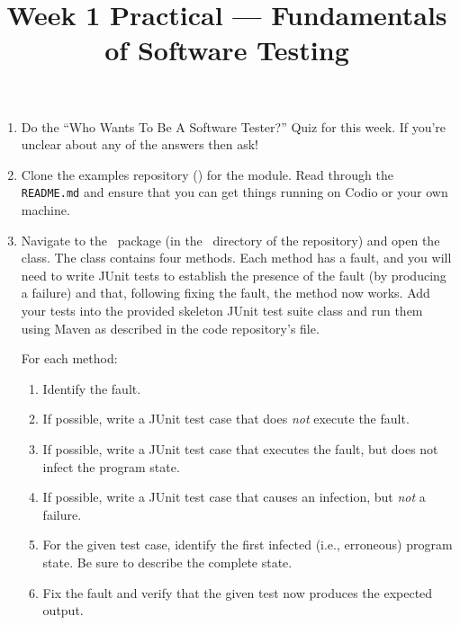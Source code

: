 



\title{Week 1 Practical --- Fundamentals of Software Testing}

\begin{enumerate}

    \item Do the ``Who Wants To Be A Software Tester?'' Quiz for this week. If
    you're unclear about any of the answers then ask!

    \item Clone the examples repository (\coderepourl) for the module. Read
    through the {\tt README.md} and ensure that you can get things running on
    Codio or your own machine.

    \item Navigate to the \practicalspackage~package (in the
    \practicalsdirectory~directory of the repository) and open the \weekoneclass
    class. The class contains four methods. Each method has a fault, and you
    will need to write JUnit tests to establish the presence of the fault (by
    producing a failure) and that, following fixing the fault, the method now
    works. Add your tests into the provided skeleton \testweekoneclass JUnit
    test suite class and run them using Maven as described in the code
    repository's \readmefile file.
    
    For each method:

        \begin{enumerate}

            \item Identify the fault.
            
            \item If possible, write a JUnit test case that does {\it not}
            execute the fault.
            
            \item If possible, write a JUnit test case that executes the fault,
            but does not infect the program state.

            \item If possible, write a JUnit test case that causes an infection,
            but {\it not} a failure.

            \item For the given test case, identify the first infected (i.e.,
            erroneous) program state. Be sure to describe the complete state.
            
            \item Fix the fault and verify that the given test now produces the
            expected output.


        \end{enumerate}

\end{enumerate}

